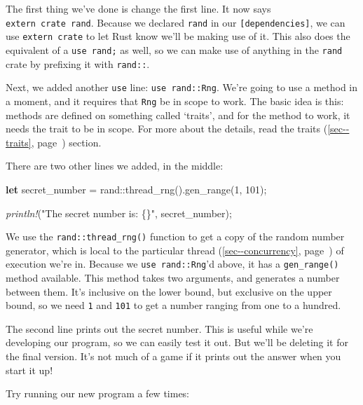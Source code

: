 \documentclass[a4paper,]{book}
\renewcommand*{\hyperlink}[2]{%
 #2 (\autoref{#1}, page~\pageref{#1})}
\newenvironment{Shaded}{\begin{snugshade}}{\end{snugshade}}
\newcommand{\KeywordTok}[1]{\textcolor[rgb]{0.13,0.29,0.53}{\textbf{{#1}}}}
\newcommand{\DecValTok}[1]{\textcolor[rgb]{0.00,0.00,0.81}{{#1}}}
\newcommand{\StringTok}[1]{\textcolor[rgb]{0.31,0.60,0.02}{{#1}}}
\newcommand{\PreprocessorTok}[1]{\textcolor[rgb]{0.56,0.35,0.01}{\textit{{#1}}}}
\newcommand{\NormalTok}[1]{{#1}}
\begin{document}
The first thing we've done is change the first line. It now says
\texttt{extern\ crate\ rand}. Because we declared \texttt{rand} in our
\texttt{{[}dependencies{]}}, we can use \texttt{extern\ crate} to let
Rust know we'll be making use of it. This also does the equivalent of a
\texttt{use\ rand;} as well, so we can make use of anything in the
\texttt{rand} crate by prefixing it with \texttt{rand::}.

Next, we added another \texttt{use} line: \texttt{use\ rand::Rng}. We're
going to use a method in a moment, and it requires that \texttt{Rng} be
in scope to work. The basic idea is this: methods are defined on
something called `traits', and for the method to work, it needs the
trait to be in scope. For more about the details, read the
\protect\hyperlink{sec--traits}{traits} section.

There are two other lines we added, in the middle:

\begin{Shaded}
\begin{Highlighting}[]
    \KeywordTok{let} \NormalTok{secret_number = rand::thread_rng().gen_range(}\DecValTok{1}\NormalTok{, }\DecValTok{101}\NormalTok{);}

    \PreprocessorTok{println!}\NormalTok{(}\StringTok{"The secret number is: \{\}"}\NormalTok{, secret_number);}
\end{Highlighting}
\end{Shaded}

We use the \texttt{rand::thread\_rng()} function to get a copy of the
random number generator, which is local to the particular
\protect\hyperlink{sec--concurrency}{thread} of execution we're in.
Because we \texttt{use\ rand::Rng}'d above, it has a
\texttt{gen\_range()} method available. This method takes two arguments,
and generates a number between them. It's inclusive on the lower bound,
but exclusive on the upper bound, so we need \texttt{1} and \texttt{101}
to get a number ranging from one to a hundred.

The second line prints out the secret number. This is useful while we're
developing our program, so we can easily test it out. But we'll be
deleting it for the final version. It's not much of a game if it prints
out the answer when you start it up!

Try running our new program a few times:
\end{document}

